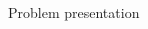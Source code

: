 \documentclass{beamer}\usepackage[]{graphicx}\usepackage[]{color}
\begin{document}
\begin{frame}[fragile]{Problem presentation}
\begin{columns}
\begin{column}{0.4\textwidth}

\end{column}
\end{columns}
\end{frame}
\end{document}
